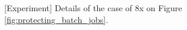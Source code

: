 \begin{figure}[!t]
	\caption{[Experiment] Details of the case of 8x on Figure \ref{fig:protecting_batch_jobs}. }
	\label{fig:protecting_batch_jobs_details}
\end{figure}


